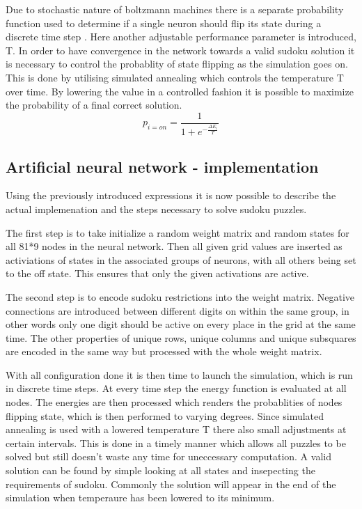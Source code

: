 \documentclass[a4paper,11pt]{kth-mag}
\begin{document}
Due to stochastic nature of boltzmann machines there is a separate probability function used to determine if a single neuron should flip its state during a discrete time step \cite{boltzmann2}.
Here another adjustable performance parameter is introduced, T.
In order to have convergence in the network towards a valid sudoku solution it is necessary to control the probablity of state flipping as the simulation goes on.
This is done by utilising simulated annealing which controls the temperature T over time.
By lowering the value in a controlled fashion it is possible to maximize the probability of a final correct solution.
\[
p_{i=on} = \frac{1}{1+e^{-\frac{\Delta E_{i}}{T}}}
\]

\subsection{Artificial neural network - implementation}

Using the previously introduced expressions it is now possible to describe the actual implemenation and the steps necessary to solve sudoku puzzles.
\newline

The first step is to take initialize a random weight matrix and random states for all 81*9 nodes in the neural network.
Then all given grid values are inserted as activiations of states in the associated groups of neurons, with all others being set to the off state.
This ensures that only the given activations are active.
\newline

The second step is to encode sudoku restrictions into the weight matrix.
Negative connections are introduced between different digits on within the same group, in other words only one digit should be active on every place in the grid at the same time.
The other properties of unique rows, unique columns and unique subsquares are encoded in the same way but processed with the whole weight matrix.
\newline

With all configuration done it is then time to launch the simulation, which is run in discrete time steps.
At every time step the energy function is evaluated at all nodes.
The energies are then processed which renders the probablities of nodes flipping state, which is then performed to varying degrees.
Since simulated annealing is used with a lowered temperature T there also small adjustments at certain intervals.
This is done in a timely manner which allows all puzzles to be solved but still doesn't waste any time for uneccessary computation.
\newline
A valid solution can be found by simple looking at all states and insepecting the requirements of sudoku.
Commonly the solution will appear in the end of the simulation when temperaure has been lowered to its minimum.
\end{document}
